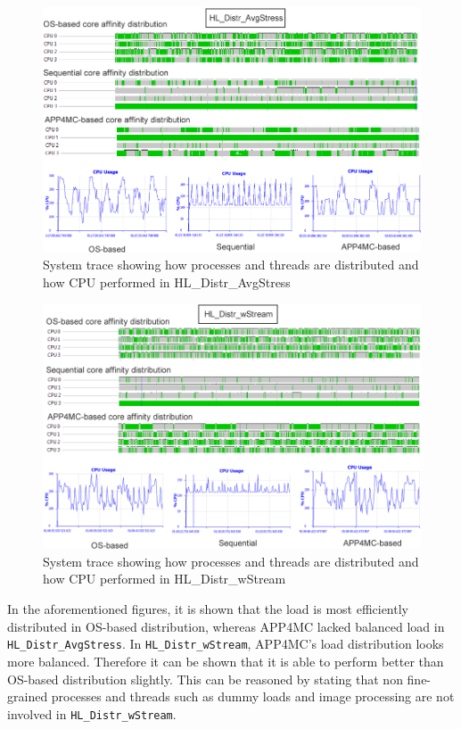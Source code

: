 \begin{figure}[!ht]
	\centering
	\captionsetup{justification=centering}
	\includegraphics[width=\textwidth]{content/images/tracesAvgStress.png}
	\caption{System trace showing how processes and threads are distributed and how CPU performed in HL{\_}Distr{\_}AvgStress}
	\label{fig:tracesAvgStress}
\end{figure}

\begin{figure}[!ht]
	\centering
	\captionsetup{justification=centering}
	\includegraphics[width=\textwidth]{content/images/traceswStream.png}
	\caption{System trace showing how processes and threads are distributed and how CPU performed in HL{\_}Distr{\_}wStream}
	\label{fig:traceswStream}
\end{figure}

In the aforementioned figures, it is shown that the load is most efficiently distributed in OS-based distribution, whereas APP4MC lacked balanced load in \texttt{HL{\_}Distr{\_}AvgStress}. In \texttt{HL{\_}Distr{\_}wStream}, APP4MC's load distribution looks more balanced. Therefore it can be shown that it is able to perform better than OS-based distribution slightly. This can be reasoned by stating that non fine-grained processes and threads such as dummy loads and image processing are not involved in \texttt{HL{\_}Distr{\_}wStream}. 


